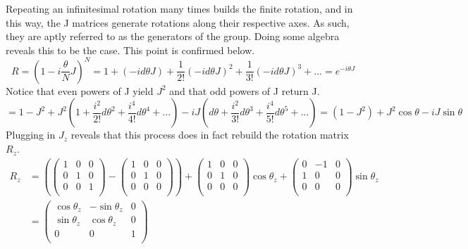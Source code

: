 Repeating an infinitesimal rotation many times builds the finite rotation, and in this way, the J matrices generate rotations along their respective axes.  As such, they are aptly referred to as the generators of the group. Doing some algebra reveals this to be the case. This point is confirmed below.
\begin{equation}
R = (1 - i\frac{\theta}{N} J)^{N} = 1 + (-id\theta J) + \frac{1}{2!}(-id\theta J)^2 + \frac{1}{3!}(-id\theta J)^3 + ... = e^{-i\theta J} 
\end{equation}
Notice that even powers of J yield $J^2$ and that odd powers of J return J.
\begin{equation}
  = 1 - J^2 + J^2(1 + \frac{i^2}{2!} d\theta^2 + \frac{i^4}{4!} d\theta^4 + ...) - iJ(d\theta + \frac{i^2}{3!}d\theta^3 + \frac{i^4}{5!}d\theta^5 + ...) 
  = (1-J^2) + J^2 \cos\theta - iJ\sin\theta
\end{equation}
Plugging in $J_z$ reveals that this process does in fact rebuild the rotation matrix $R_z$.
\begin{equation}
\begin{split}
R_z &= 
(\begin{pmatrix}
1 & 0 & 0 \\
0 & 1 & 0 \\
0 & 0 & 1 \\
\end{pmatrix}
-
\begin{pmatrix}
1 & 0 & 0 \\
0 & 1 & 0 \\
0 & 0 & 0 \\
\end{pmatrix})
+
\begin{pmatrix}
1 & 0 & 0 \\
0 & 1 & 0 \\
0 & 0 & 0 \\
\end{pmatrix}
\cos\theta_z
+
\begin{pmatrix}
0 & -1 & 0 \\
1 & 0 & 0 \\
0 & 0 & 0 \\
\end{pmatrix}
\sin\theta_z
\\ &=
\begin{pmatrix}
\cos\theta_z & -\sin\theta_z & 0 \\
\sin\theta_z & \cos\theta_z & 0 \\
0 & 0 & 1 \\
\end{pmatrix}
\end{split}
\end{equation}

